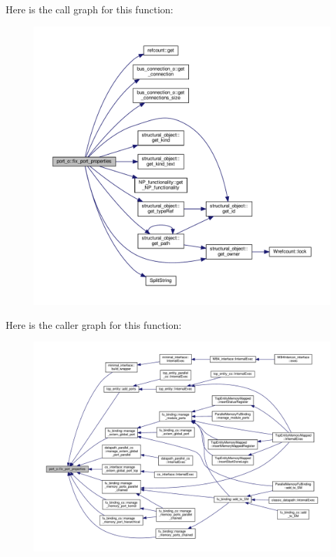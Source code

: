 Here is the call graph for this function\+:
\nopagebreak
\begin{figure}[H]
\begin{center}
\leavevmode
\includegraphics[width=350pt]{df/d75/structport__o_a92c2d286abadb846cf9134e69fb9590e_cgraph}
\end{center}
\end{figure}
Here is the caller graph for this function\+:
\nopagebreak
\begin{figure}[H]
\begin{center}
\leavevmode
\includegraphics[width=350pt]{df/d75/structport__o_a92c2d286abadb846cf9134e69fb9590e_icgraph}
\end{center}
\end{figure}
\mbox{\label{structport__o_ab3b76812ca210b6124ee07d4401380ed}} 
